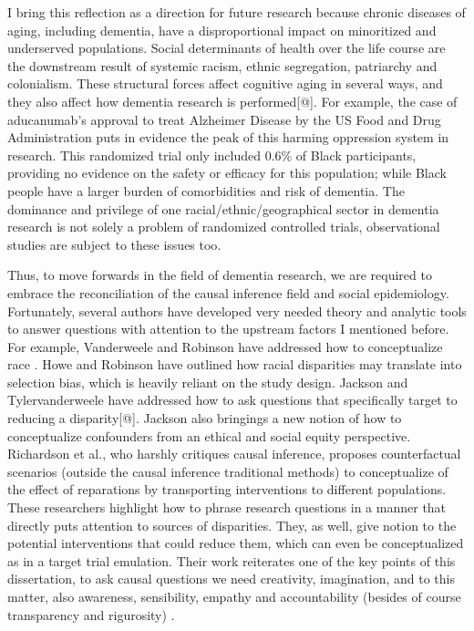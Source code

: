 \documentclass[
]{book}
\begin{document}
I bring this reflection as a direction for future research because chronic diseases of aging, including dementia, have a disproportional impact on minoritized and underserved populations\autocite{mayeda2016,nebel2018,weave2018}. Social determinants of health over the life course are the downstream result of systemic racism, ethnic segregation, patriarchy and colonialism. These structural forces affect cognitive aging in several ways\autocite{glymour_manley2008}, and they also affect how dementia research is performed{[}@{]}. For example, the case of aducanumab's approval to treat Alzheimer Disease by the US Food and Drug Administration puts in evidence the peak of this harming oppression system in research. This randomized trial only included 0.6\% of Black participants, providing no evidence on the safety or efficacy for this population; while Black people have a larger burden of comorbidities and risk of dementia\autocite{manley2021}. The dominance and privilege of one racial/ethnic/geographical sector in dementia research is not solely a problem of randomized controlled trials\autocite{gilmore2021,manley2021,raman2021}, observational studies are subject to these issues too\autocite{howe2018}.

Thus, to move forwards in the field of dementia research, we are required to embrace the reconciliation of the causal inference field and social epidemiology. Fortunately, several authors have developed very needed theory and analytic tools to answer questions with attention to the upstream factors I mentioned before. For example, Vanderweele and Robinson have addressed how to conceptualize race \autocite{vanderweele2014}. Howe and Robinson have outlined how racial disparities may translate into selection bias, which is heavily reliant on the study design\autocite{howe2018}. Jackson and Tylervanderweele have addressed how to ask questions that specifically target to reducing a disparity{[}@{]}. Jackson also bringings a new notion of how to conceptualize confounders from an ethical and social equity perspective\autocite{jackson2020}. Richardson et al., who harshly critiques causal inference, proposes counterfactual scenarios (outside the causal inference traditional methods) to conceptualize of the effect of reparations by transporting interventions to different populations. These researchers highlight how to phrase research questions in a manner that directly puts attention to sources of disparities. They, as well, give notion to the potential interventions that could reduce them, which can even be conceptualized as in a target trial emulation. Their work reiterates one of the key points of this dissertation, to ask causal questions we need creativity, imagination, and to this matter, also awareness, sensibility, empathy and accountability (besides of course transparency and rigurosity) .
\end{document}
